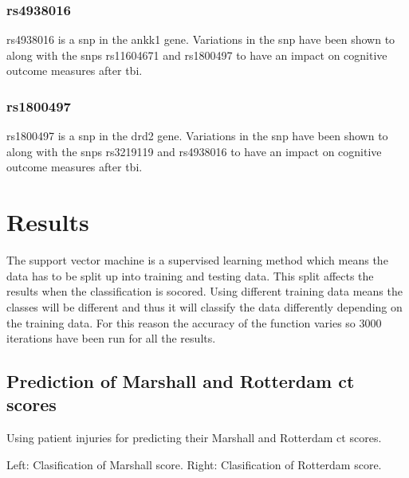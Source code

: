 \documentclass[11pt]{article}
\begin{document}
\subsubsection{rs4938016}
rs4938016 is a \gls{snp} in the \gls{ankk1} gene\cite{mcallisterSingleNucleotidePolymorphisms2008a}. Variations in the \gls{snp} have been shown to along with the \glspl{snp} rs11604671 and rs1800497 to have an impact on cognitive outcome measures after \gls{tbi}.\cite{mcallisterSingleNucleotidePolymorphisms2008a}

\subsubsection{rs1800497}
rs1800497 is a \gls{snp} in the \gls{drd2} gene\cite{Rs1800497SNPedia}. Variations in the \gls{snp} have been shown to along with the \glspl{snp} rs3219119 and rs4938016 to have an impact on cognitive outcome measures after \gls{tbi}.\cite{mcallisterSingleNucleotidePolymorphisms2008a}

\section{Results}
The support vector machine is a supervised learning method which means the data has to be split up into training and testing data. This split affects the results when the classification is socored. Using different training data means the classes will be different and thus it will classify the data differently depending on the training data. For this reason the accuracy of the function varies so 3000 iterations have been run for all the results.

\subsection{Prediction of Marshall and Rotterdam \gls{ct} scores}
Using patient injuries for predicting their Marshall and Rotterdam \gls{ct} scores.\\
\begin{center}
  Left: Clasification of Marshall score. Right: Clasification of Rotterdam score.
   \hspace{.5cm}
\end{center}
\end{document}
